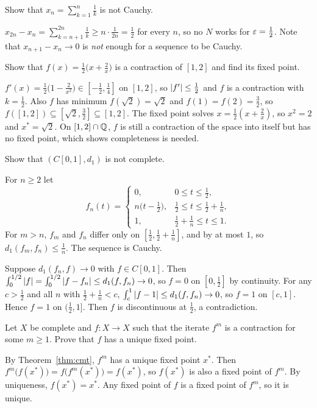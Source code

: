 \begin{exercise}\easy
Show that $x_n=\sum_{k=1}^n\frac1k$ is not Cauchy.
\end{exercise}
\begin{solution}
$\displaystyle x_{2n}-x_n=\sum_{k=n+1}^{2n}\frac1k\ge n\cdot\frac1{2n}=\frac12$ for every $n$, so no $N$ works for $\varepsilon=\frac12$. Note that $x_{n+1}-x_n\to0$ is \emph{not} enough for a sequence to be Cauchy.
\end{solution}

\begin{exercise}\medium
Show that $f(x)=\frac12\bigl(x+\frac2x\bigr)$ is a contraction of $[1,2]$ and find its fixed point.
\end{exercise}
\begin{solution}
$f'(x)=\frac12\bigl(1-\frac2{x^2}\bigr)\in[-\frac12,\frac14]$ on $[1,2]$, so $\left\lvert f'\right\rvert\le\frac12$ and $f$ is a contraction with $k=\frac12$. Also $f$ has minimum $f(\sqrt2)=\sqrt2$ and $f(1)=f(2)=\frac32$, so $f([1,2])\subseteq[\sqrt2,\frac32]\subseteq[1,2]$. The fixed point solves $x=\frac12(x+\frac2x)$, so $x^2=2$ and $x^*=\sqrt2$. On $[1,2]\cap\mathbb{Q}$, $f$ is still a contraction of the space into itself but has no fixed point, which shows completeness is needed.
\end{solution}

\begin{exercise}\hard\label{exr:d1incomplete}
Show that $(C[0,1],d_1)$ is not complete.
\end{exercise}
\begin{solution}
For $n\ge2$ let
\[
  f_n(t)=\begin{cases}0,&0\le t\le\frac12,\\ n\bigl(t-\frac12\bigr),&\frac12\le t\le\frac12+\frac1n,\\ 1,&\frac12+\frac1n\le t\le1.\end{cases}
\]
For $m>n$, $f_m$ and $f_n$ differ only on $[\frac12,\frac12+\frac1n]$, and by at most $1$, so $d_1(f_m,f_n)\le\frac1n$. The sequence is Cauchy.

Suppose $d_1(f_n,f)\to0$ with $f\in C[0,1]$. Then $\int_0^{1/2}\left\lvert f\right\rvert=\int_0^{1/2}\left\lvert f-f_n\right\rvert\le d_1(f,f_n)\to0$, so $f=0$ on $[0,\frac12]$ by continuity. For any $c>\frac12$ and all $n$ with $\frac12+\frac1n<c$, $\int_c^1\left\lvert f-1\right\rvert\le d_1(f,f_n)\to0$, so $f=1$ on $[c,1]$. Hence $f=1$ on $(\frac12,1]$. Then $f$ is discontinuous at $\frac12$, a contradiction.
\end{solution}

\begin{exercise}\hard
Let $X$ be complete and $f\colon X\to X$ such that the iterate $f^m$ is a contraction for some $m\ge1$. Prove that $f$ has a unique fixed point.
\end{exercise}
\begin{solution}
By Theorem~\ref{thm:cmt}, $f^m$ has a unique fixed point $x^*$. Then $f^m\bigl(f(x^*)\bigr)=f\bigl(f^m(x^*)\bigr)=f(x^*)$, so $f(x^*)$ is also a fixed point of $f^m$. By uniqueness, $f(x^*)=x^*$. Any fixed point of $f$ is a fixed point of $f^m$, so it is unique.
\end{solution}
